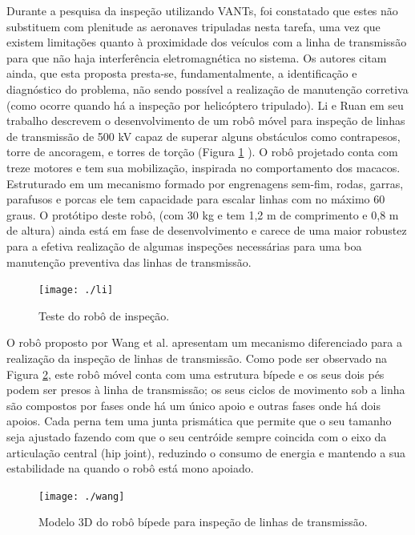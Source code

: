 Durante a pesquisa da inspeção utilizando VANTs, foi constatado que estes não substituem com plenitude as aeronaves tripuladas nesta tarefa, uma vez que existem limitações quanto à proximidade dos veículos com a linha de transmissão para que não haja interferência eletromagnética no sistema. Os autores citam ainda, que esta proposta presta-se, fundamentalmente, a identificação e diagnóstico do problema, não sendo possível a realização de manutenção corretiva (como ocorre quando há a inspeção por helicóptero tripulado).  
Li e Ruan \cite{li2010autonomous} em seu trabalho descrevem o desenvolvimento de um robô móvel para inspeção de linhas de transmissão de 500 kV capaz de superar alguns obstáculos como contrapesos, torre de ancoragem, e torres de torção (Figura \ref{img:li} ). O robô projetado conta com treze motores e tem sua mobilização, inspirada no comportamento dos macacos. Estruturado em um mecanismo formado por engrenagens sem-fim, rodas, garras, parafusos e porcas ele tem capacidade para escalar linhas com no máximo 60 graus. O protótipo deste robô, (com 30 kg e tem 1,2 m de comprimento e 0,8 m de altura) ainda está em fase de desenvolvimento e carece de uma maior robustez para a efetiva realização de algumas inspeções necessárias para uma boa manutenção preventiva das linhas de transmissão.

\begin{figure} [h!]	
	\caption{Teste do robô de inspeção.}
	\label{img:li}											 
	\centering													 
	\texttt{[image: ./li]}
\end{figure}													 

O robô proposto por Wang et al. \cite{wang2010design} apresentam um mecanismo diferenciado para a realização da inspeção de linhas de transmissão. Como pode ser observado na Figura \ref{img:wang}, este robô móvel conta com uma estrutura bípede e os seus dois pés podem ser presos à linha de transmissão; os seus ciclos de movimento sob a linha são compostos por fases onde há um único apoio e outras fases onde há dois apoios. Cada perna tem uma junta prismática que permite que o seu tamanho seja ajustado fazendo com que o seu centróide sempre coincida com o eixo da articulação central (hip joint), reduzindo o consumo de energia e mantendo a sua estabilidade na quando o robô está mono apoiado. 

\begin{figure} [h!]	
	\caption{Modelo 3D do robô bípede para inspeção de linhas de transmissão.}
	\label{img:wang}											 
	\centering													 
	\texttt{[image: ./wang]}
\end{figure}													 

